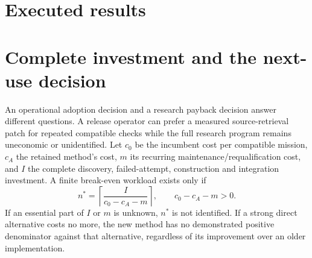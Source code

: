 \documentclass[11pt,a4paper]{article}
\begin{document}
\section{Executed results}
\label{sec:results}


\section{Complete investment and the next-use decision}
\label{sec:cost}

An operational adoption decision and a research payback decision answer different questions. A release operator can prefer a measured source-retrieval patch for repeated compatible checks while the full research program remains uneconomic or unidentified. Let $c_0$ be the incumbent cost per compatible mission, $c_A$ the retained method's cost, $m$ its recurring maintenance/requalification cost, and $I$ the complete discovery, failed-attempt, construction and integration investment. A finite break-even workload exists only if
\begin{equation}
 n^*=\left\lceil\frac{I}{c_0-c_A-m}\right\rceil,\qquad c_0-c_A-m>0.
\end{equation}
If an essential part of $I$ or $m$ is unknown, $n^*$ is not identified. If a strong direct alternative costs no more, the new method has no demonstrated positive denominator against that alternative, regardless of its improvement over an older implementation.
\end{document}
